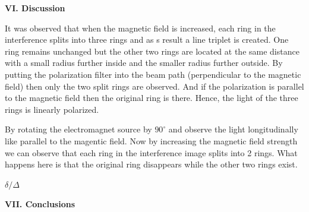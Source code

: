 \documentclass[fleqn]{article}
\begin{document}
  \pagebreak

  \textbf{VI. Discussion}

  \vspace{10px}

  It was observed that when the magnetic field is increased, each ring in the interference splits into three rings and as s result a line
  triplet is created. One ring remains unchanged but the other two rings are located at the same distance with a small radius further 
  inside and the smaller radius further outside. By putting the polarization filter into the beam path (perpendicular to the magnetic field)
  then only the two split rings are observed. And if the polarization is parallel to the magnetic field then the original ring is there. Hence,
  the light of the three rings is linearly polarized.

  By rotating the electromagnet source by $90^{\circ}$ and observe the light longitudinally like parallel to the magentic field. Now by 
  increasing the magnetic field strength we can observe that each ring in the interference image splits into 2 rings. What happens here 
  is that the original ring disappears while the other two rings exist.

  $\delta/\Delta$


  \vspace{20px}

  \textbf{VII. Conclusions}

  \printbibliography
\end{document}
